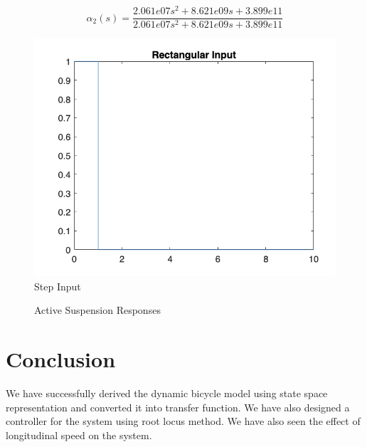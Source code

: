 \documentclass[12pt, a4paper, oneside]{report}
\begin{document}
\begin{equation}
    \alpha_2 (s) = \frac{2.061e07 s^2 + 8.621e09 s + 3.899e11}{2.061e07 s^2 + 8.621e09 s + 3.899e11}
    \label{eq:Q4_active_alpha2}
\end{equation}

\begin{figure}[h]
    \centering
    \includegraphics[width=0.5\linewidth]{images/Q4_step_input.png}
    \caption{Step Input}
    \label{fig:Q4_step_input}
\end{figure}

\begin{figure}[h]
    \hfill
    \par 
    \caption{Active Suspension Responses}
    \label{fig:Q4_active_responses}
\end{figure}



\chapter{Conclusion}

We have successfully derived the dynamic bicycle model using state space representation and converted it into transfer function. We have also designed a controller for the system using root locus method. We have also seen the effect of longitudinal speed on the system.
\end{document}
